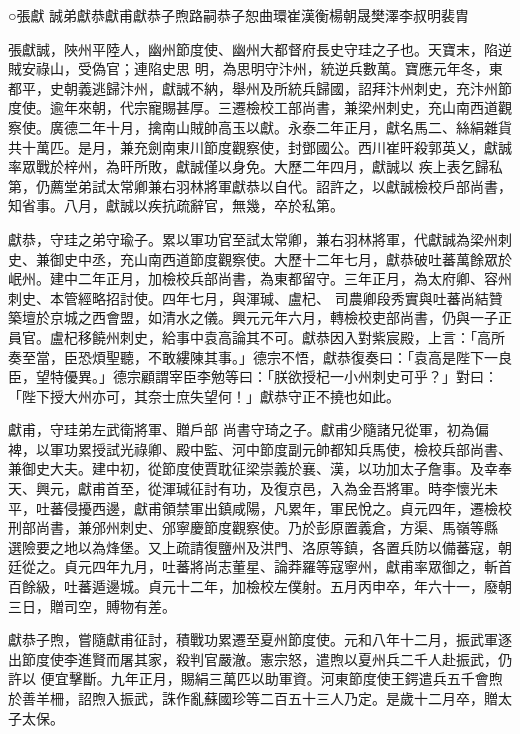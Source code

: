 
\begin{pinyinscope}

 ○張獻
 誠弟獻恭獻甫獻恭子煦路嗣恭子恕曲環崔漢衡楊朝晟樊澤李叔明裴胄



 張獻誠，陜州平陸人，幽州節度使、幽州大都督府長史守珪之子也。天寶末，陷逆賊安祿山，受偽官；連陷史思
 明，為思明守汴州，統逆兵數萬。寶應元年冬，東都平，史朝義逃歸汴州，獻誠不納，舉州及所統兵歸國，詔拜汴州刺史，充汴州節度使。逾年來朝，代宗寵賜甚厚。三遷檢校工部尚書，兼梁州刺史，充山南西道觀察使。廣德二年十月，擒南山賊帥高玉以獻。永泰二年正月，獻名馬二、絲絹雜貨共十萬匹。是月，兼充劍南東川節度觀察使，封鄧國公。西川崔旰殺郭英乂，獻誠率眾戰於梓州，為旰所敗，獻誠僅以身免。大歷二年四月，獻誠以
 疾上表乞歸私第，仍薦堂弟試太常卿兼右羽林將軍獻恭以自代。詔許之，以獻誠檢校戶部尚書，知省事。八月，獻誠以疾抗疏辭官，無幾，卒於私第。



 獻恭，守珪之弟守瑜子。累以軍功官至試太常卿，兼右羽林將軍，代獻誠為梁州刺史、兼御史中丞，充山南西道節度觀察使。大歷十二年七月，獻恭破吐蕃萬餘眾於岷州。建中二年正月，加檢校兵部尚書，為東都留守。三年正月，為太府卿、容州刺史、本管經略招討使。四年七月，與渾瑊、盧杞、
 司農卿段秀實與吐蕃尚結贊築壇於京城之西會盟，如清水之儀。興元元年六月，轉檢校吏部尚書，仍與一子正員官。盧杞移饒州刺史，給事中袁高論其不可。獻恭因入對紫宸殿，上言：「高所奏至當，臣恐煩聖聽，不敢縷陳其事。」德宗不悟，獻恭復奏曰：「袁高是陛下一良臣，望特優異。」德宗顧謂宰臣李勉等曰：「朕欲授杞一小州刺史可乎？」對曰：「陛下授大州亦可，其奈士庶失望何！」獻恭守正不撓也如此。



 獻甫，守珪弟左武衛將軍、贈戶部
 尚書守琦之子。獻甫少隨諸兄從軍，初為偏裨，以軍功累授試光祿卿、殿中監、河中節度副元帥都知兵馬使，檢校兵部尚書、兼御史大夫。建中初，從節度使賈耽征梁崇義於襄、漢，以功加太子詹事。及幸奉天、興元，獻甫首至，從渾瑊征討有功，及復京邑，入為金吾將軍。時李懷光未平，吐蕃侵擾西邊，獻甫領禁軍出鎮咸陽，凡累年，軍民悅之。貞元四年，遷檢校刑部尚書，兼邠州刺史、邠寧慶節度觀察使。乃於彭原置義倉，方渠、馬嶺等縣
 選險要之地以為烽堡。又上疏請復鹽州及洪門、洛原等鎮，各置兵防以備蕃寇，朝廷從之。貞元四年九月，吐蕃將尚志董星、論莽羅等寇寧州，獻甫率眾御之，斬首百餘級，吐蕃遁邊城。貞元十二年，加檢校左僕射。五月丙申卒，年六十一，廢朝三日，贈司空，賻物有差。



 獻恭子煦，嘗隨獻甫征討，積戰功累遷至夏州節度使。元和八年十二月，振武軍逐出節度使李進賢而屠其家，殺判官嚴澈。憲宗怒，遣煦以夏州兵二千人赴振武，仍許以
 便宜擊斷。九年正月，賜絹三萬匹以助軍資。河東節度使王鍔遣兵五千會煦於善羊柵，詔煦入振武，誅作亂蘇國珍等二百五十三人乃定。是歲十二月卒，贈太子太保。




\end{pinyinscope}
